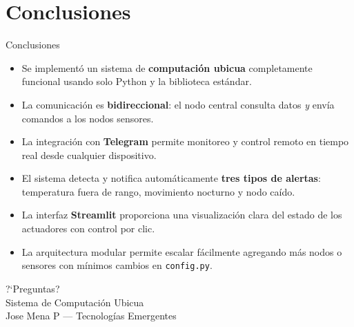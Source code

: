 \documentclass[aspectratio=169]{beamer}
\begin{document}
\section{Conclusiones}

\begin{frame}{Conclusiones}

\begin{itemize}
  \item Se implement\'o un sistema de \textbf{computaci\'on ubicua} completamente funcional
        usando solo Python y la biblioteca est\'andar.

  \vspace{0.4em}
  \item La comunicaci\'on es \textbf{bidireccional}: el nodo central consulta datos
        \textit{y} env\'ia comandos a los nodos sensores.

  \vspace{0.4em}
  \item La integraci\'on con \textbf{Telegram} permite monitoreo y control remoto
        en tiempo real desde cualquier dispositivo.

  \vspace{0.4em}
  \item El sistema detecta y notifica autom\'aticamente \textbf{tres tipos de alertas}:
        temperatura fuera de rango, movimiento nocturno y nodo ca\'ido.

  \vspace{0.4em}
  \item La interfaz \textbf{Streamlit} proporciona una visualizaci\'on clara del
        estado de los actuadores con control por clic.

  \vspace{0.4em}
  \item La arquitectura modular permite escalar f\'acilmente agregando m\'as nodos
        o sensores con m\'inimos cambios en \texttt{config.py}.
\end{itemize}
\end{frame}

\begin{frame}{}
\begin{center}
{\Huge ?`Preguntas?}\\[1em]
{\large Sistema de Computaci\'on Ubicua}\\[0.5em]
{\normalsize Jose Mena P --- Tecnolog\'ias Emergentes}
\end{center}
\end{frame}
\end{document}
